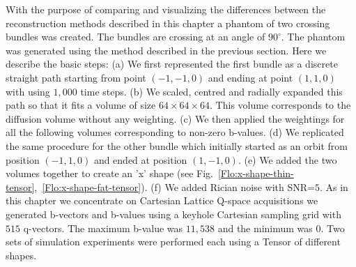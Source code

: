 \documentclass{bioinfo}
\begin{document}
With the purpose of comparing and visualizing the differences between
the reconstruction methods described in this chapter a phantom of
two crossing bundles was created. The bundles are crossing at an angle
of $90^{\circ}$. The phantom was generated using the method described
in the previous section. Here we describe the basic steps: (a) We
first represented the first bundle as a discrete straight path starting
from point $(-1,-1,0)$ and ending at point $(1,1,0)$ with using
$1,000$ time steps. (b) We scaled, centred and radially expanded
this path so that it fits a volume of size $64\times64\times64$.
This volume corresponds to the diffusion volume without any weighting.
(c) We then applied the weightings for all the following volumes corresponding
to non-zero b-values. (d) We replicated the same procedure for the
other bundle which initially started as an orbit from position $(-1,1,0)$
and ended at position $(1,-1,0)$. (e) We added the two volumes together
to create an 'x' shape (see Fig.~\ref{Flo:x-shape-thin-tensor},~\ref{Flo:x-shape-fat-tensor}).
(f) We added Rician noise with SNR=$5$. As in this chapter we concentrate
on Cartesian Lattice Q-space acquisitions we generated b-vectors and
b-values using a keyhole Cartesian sampling grid \citep{Tuch2002ThesisMIT}
with $515$ q-vectors. The maximum b-value was $11,538$ and the minimum
was $0$. Two sets of simulation experiments were performed each using
a Tensor of different shapes.
\end{document}
